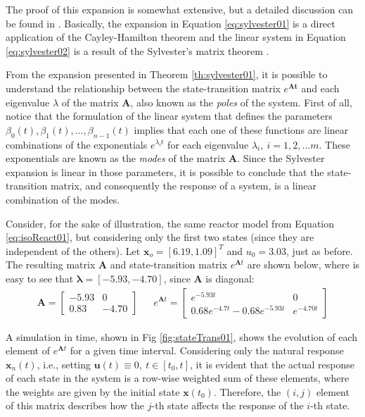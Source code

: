 \documentclass[a4paper,11pt]{book}
\numberwithin{figure}{chapter}
\numberwithin{equation}{chapter}
\numberwithin{table}{chapter}
\theoremstyle{definition}
\begin{document}
The proof of this expansion is somewhat extensive, but a detailed discussion can be found in \cite{Chen:1998}. Basically, the expansion in Equation \eqref{eq:sylvester01} is a direct application of the Cayley-Hamilton theorem \cite{Atiyah:2018} and the linear system in Equation \eqref{eq:sylvester02} is a result of the Sylvester's matrix theorem  \cite{Horn:2012}.

From the expansion presented in Theorem \ref{th:sylvester01}, it is possible to understand the relationship between the state-transition matrix $e^{\bm{At}}$ and each eigenvalue $\lambda$ of the matrix $\bm{A}$, also known as the \textit{poles} of the system. First of all, notice that the formulation of the linear system that defines the parameters $\beta_0(t), \beta_1(t), ..., \beta_{n-1}(t)$ implies that each one of these functions are linear combinations of the exponentials $e^{\lambda_i t}$ for each eigenvalue $\lambda_i,\ i=1,2,...m$. These exponentials are known as the \textit{modes} of the matrix $\bm{A}$. Since the Sylvester expansion is linear in those parameters, it is possible to conclude that the state-transition matrix, and consequently the response of a system, is a linear combination of the modes.

Consider, for the sake of illustration, the same reactor model from Equation \eqref{eq:isoReact01}, but considering only the first two states (since they are independent of the others). Let $\bm{x}_o = [6.19, 1.09]^T$ and $u_0 = 3.03$, just as before. The resulting matrix $\bm{A}$ and state-transition matrix $e^{\bm{A} t}$ are shown below, where is easy to see that $\bm{\lambda} = [-5.93, -4.70]$, since $\bm{A}$ is diagonal:
\begin{align} \label{eq:stateRespEx01}
    \bm{A} = \begin{bmatrix} 
    	-5.93  &        0 \\
	    0.83   &  -4.70 
    \end{bmatrix} && e^{\bm{A} t} = \begin{bmatrix} 
    	e^{-5.93 t}  &        0 \\
	    0.68 e^{-4.7 t} - 0.68 e^{-5.93 t}  &  e^{-4.70 t} 
    \end{bmatrix}
\end{align}

A simulation in time, shown in Fig \ref{fig:stateTrans01}, shows the evolution of each element of $e^{\bm{A} t}$ for a given time interval. Considering only the natural response $\bm{x}_n(t)$, i.e., setting $\bm{u}(t) \equiv 0,\ t \in [t_0, t]$, it is evident that the actual response of each state in the system is a row-wise weighted sum of these elements, where the weights are given by the initial state $\bm{x}(t_0)$. Therefore, the $(i, j)$ element of this matrix describes how the $j$-th state affects the response of the $i$-th state.
\end{document}
